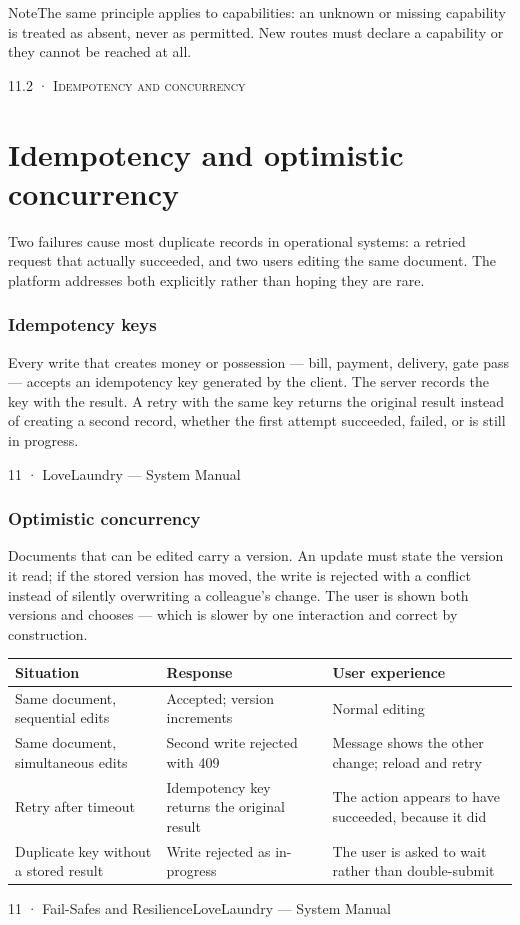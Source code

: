 \documentclass[11pt,a4paper,oneside]{book}
\begin{document}
\begin{notebox}NoteThe same principle applies to capabilities: an unknown or missing capability is treated as absent, never as permitted. New routes must declare a capability or they cannot be reached at all.\end{notebox}
\textsc{\small\color{crimson}11.2 · Idempotency and concurrency}\par\medskip
\section*{Idempotency and optimistic concurrency}
Two failures cause most duplicate records in operational systems: a retried request that actually succeeded, and two users editing the same document. The platform addresses both explicitly rather than hoping they are rare.

\subsubsection*{Idempotency keys}
Every write that creates money or possession — bill, payment, delivery, gate pass — accepts an idempotency key generated by the client. The server records the key with the result. A retry with the same key returns the original result instead of creating a second record, whether the first attempt succeeded, failed, or is still in progress.

11 · LoveLaundry — System Manual

\subsubsection*{Optimistic concurrency}
Documents that can be edited carry a version. An update must state the version it read; if the stored version has moved, the write is rejected with a conflict instead of silently overwriting a colleague's change. The user is shown both versions and chooses — which is slower by one interaction and correct by construction.

\begin{center}\small
\begin{tabularx}{\linewidth}{|X|X|X|}
\hline
\rowcolor{lightgrey}
\textbf{Situation} & \textbf{Response} & \textbf{User experience} \\ \hline
Same document, sequential edits & Accepted; version increments & Normal editing \\ \hline
Same document, simultaneous edits & Second write rejected with 409 & Message shows the other change; reload and retry \\ \hline
Retry after timeout & Idempotency key returns the original result & The action appears to have succeeded, because it did \\ \hline
Duplicate key without a stored result & Write rejected as in-progress & The user is asked to wait rather than double-submit \\ \hline
\end{tabularx}
\end{center}
11 · Fail-Safes and ResilienceLoveLaundry — System Manual
\end{document}
